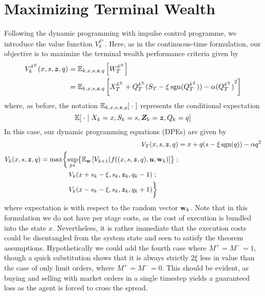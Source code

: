 \section{Maximizing Terminal Wealth}
Following the dynamic programming with impulse control programme, we introduce the value function $V_k^{\delta^\pm}$. Here, as in the continuous-time formulation, our objective is to maximize the terminal wealth performance criteria given by
\begin{align}
V_k^{\delta^\pm} (x,s,\bm{z},q) & = \mathbb{E}_{k,x,s,\bm{z},q} \left[ W_T^{\delta^\pm} \right] \\ & = \mathbb{E}_{k,x,s,\bm{z},q}\left[ X_T^{\delta^\pm} + Q_T^{\delta^\pm}(S_T - \xi\operatorname{\mathrm{sgn}}(Q_T^{\delta^\pm})) - \alpha {(Q_T^{\delta^\pm})}^2 \right]
\end{align}
where, as before, the notation $\mathbb{E}_{k,x,s,\bm{z},q}[ \; \cdot \; ]$ represents the conditional expectation
\[ \mathbb{E} [ \; \cdot \; | \; X_k = x, S_k = s, \bm{Z}_k = \bm{z}, Q_k = q] \]
In this case, our dynamic programming equations (DPEs) are given by
\begin{align}
V_T (x,s,\bz,q) & = x + q(s-\xi\sgn(q)) - \alpha q^2 \\
\label{eq:discreteDPEinitial}
\begin{split}
V_k (x,s,\bz,q) & = \max \biggl\lbrace \sup_{\delta^\pm} \bigl\lbrace \E_{\bw} \left[ V_{k+1} (f((x,s,\bz,q),\bu,\bw_k) \right] \bigr\rbrace \; ; \\
& \hphantom{{}={} \max \biggl\lbrace} V_k(x+s_k-\xi,s_k, \bz_k, q_k -1) \; ; \\
& \hphantom{{}={} \max \biggl\lbrace} V_k(x-s_k-\xi,s_k, \bz_k, q_k +1) \biggr\rbrace
\end{split}
\end{align}
where expectation is with respect to the random vector $\mathbf{w}_k$. Note that in this formulation we do not have per stage costs, as the cost of execution is bundled into the state $x$. Nevertheless, it is rather immediate that the execution costs could be disentangled from the system state and seen to satisfy the theorem assumptions. Hypothetically we could add the fourth case where $M^+ = M^- = 1$, though a quick substitution shows that it is always strictly $2\xi$ less in value than the case of only limit orders, where $M^+ = M^- = 0$. This should be evident, as buying and selling with market orders in a single timestep yields a guaranteed loss as the agent is forced to cross the spread. 

